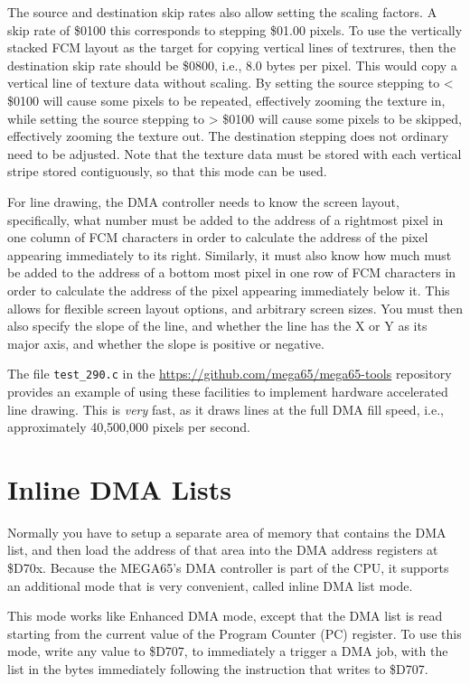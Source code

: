 The source and destination
skip rates also allow setting the scaling factors.  A skip rate of \$0100 this corresponds to stepping \$01.00 pixels.
To use the vertically stacked FCM layout as the target for copying vertical lines of textrures, then the destination
skip rate should be \$0800, i.e., 8.0 bytes per pixel.  This would copy a vertical line of texture data without scaling.
By setting the source stepping to < \$0100 will cause some pixels to be repeated, effectively zooming the texture in,
while setting the source stepping to > \$0100 will cause some pixels to be skipped, effectively zooming the texture out.
The destination stepping does not ordinary need to be adjusted.  Note that the texture data must be stored with each
vertical stripe stored contiguously, so that this mode can be used.

For line drawing, the DMA controller needs to know the screen layout, specifically, what number must be added to the
address of a rightmost pixel in one column of FCM characters in order to calculate the address of the pixel appearing
immediately to its right. Similarly, it must also know how much must be added to the address of a bottom most pixel in
one row of FCM characters in order to calculate the address of the pixel appearing immediately below it.  This allows
for flexible screen layout options, and arbitrary screen sizes.  You must then also specify the slope of the line, and
whether the line has the X or Y as its major axis, and whether the slope is positive or negative.

The file {\tt test\_290.c}
in the \url{https://github.com/mega65/mega65-tools} repository provides an example of using these facilities to
implement hardware accelerated line drawing. This is {\em very} fast, as it draws lines at the full DMA fill speed,
i.e., approximately 40,500,000 pixels per second.

\section{Inline DMA Lists}

Normally you have to setup a separate area of memory that contains the DMA list, and then load the address of that
area into the DMA address registers at \$D70x.  Because the MEGA65's DMA controller is part of the CPU, it supports
an additional mode that is very convenient, called inline DMA list mode.

This mode works like Enhanced DMA mode, except that the DMA list is read starting from the current value of the
Program Counter (PC) register.  To use this mode, write any value to \$D707, to immediately a trigger a DMA job,
with the list in the bytes immediately following the instruction that writes to \$D707.

